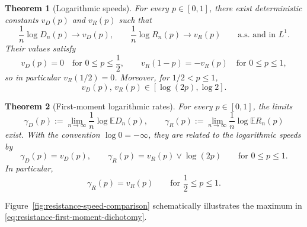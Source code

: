 \documentclass[12pt,preprint]{amsart}
\numberwithin{equation}{section}
\theoremstyle{plain}
\newtheorem{theorem}{Theorem}[section]
\theoremstyle{definition}
\newcommand{\E}{\mathbb E}
\begin{document}
\begin{theorem}[Logarithmic speeds]
\label{thm:logarithmic-speeds}
For every $p\in[0,1]$, there exist deterministic constants $v_D(p)$ and
$v_R(p)$ such that
\begin{equation}
 \frac1n\log D_n(p)\longrightarrow v_D(p),
 \qquad
 \frac1n\log R_n(p)\longrightarrow v_R(p)
 \qquad\text{a.s. and in }L^1.
 \label{eq:full-range-L1}
\end{equation}
Their values satisfy
\begin{equation*}
 v_D(p)=0\quad\text{for }0\le p\le\frac12,
 \qquad
 v_R(1-p)=-v_R(p)\quad\text{for }0\le p\le1,
\end{equation*}
so in particular $v_R(1/2)=0$.  Moreover, for $1/2<p\le1$,
\begin{equation}
 v_D(p),\,v_R(p)\in[\log(2p),\log2].
 \label{eq:supercritical-speed-bounds}
\end{equation}
\end{theorem}

\begin{theorem}[First-moment logarithmic rates]
\label{thm:first-moment-logarithmic-rates}
For every $p\in[0,1]$, the limits
\begin{equation*}
 \gamma_D(p):=\lim_{n\to\infty}\frac1n\log\E D_n(p),
 \qquad
 \gamma_R(p):=\lim_{n\to\infty}\frac1n\log\E R_n(p)
\end{equation*}
exist.  With the convention $\log0=-\infty$, they are related to the
logarithmic speeds by
\begin{equation}\label{eq:resistance-first-moment-dichotomy}
 \gamma_D(p)=v_D(p),
 \qquad
 \gamma_R(p)=v_R(p)\vee\log(2p)
 \qquad\text{for }0\le p\le1.
\end{equation}
In particular,
\begin{equation}
 \gamma_R(p)=v_R(p)\qquad\text{for }\frac12\le p\le1.
 \label{eq:supercritical-resistance-identification}
\end{equation}
\end{theorem}

Figure~\ref{fig:resistance-speed-comparison} schematically illustrates
the maximum in \eqref{eq:resistance-first-moment-dichotomy}.
\end{document}
